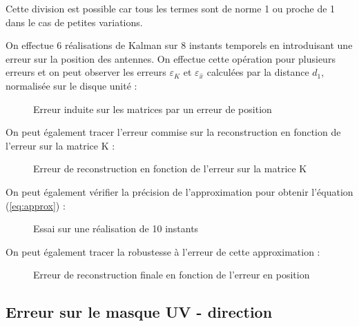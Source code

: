 \documentclass[titlepage]{article}
\begin{document}
	Cette division est possible car tous les termes sont de norme 1 ou proche de 1 dans le cas de petites variations.
	
	On effectue 6 réalisations de Kalman sur 8 instants temporels en introduisant une erreur sur la position des antennes. On effectue cette opération pour plusieurs erreurs et on peut observer les erreurs $\varepsilon_K$ et $\varepsilon_{\widehat{x}}$ calculées par la distance $d_1$, normalisée sur le disque unité :
	
	\begin{figure}[H]
		\centering
		\begin{subfigure}{.5\textwidth}
			\centering
			
		\end{subfigure}%
		\begin{subfigure}{.5\textwidth}
			\centering
			
		\end{subfigure}
		\caption{Erreur induite sur les matrices par un erreur de position}
	\end{figure}

	On peut également tracer l'erreur commise sur la reconstruction en fonction de l'erreur sur la matrice K :
	
	\begin{figure}[H]
		\centering
		
		\caption{Erreur de reconstruction en fonction de l'erreur sur la matrice K}
	\end{figure}
	
	On peut également vérifier la précision de l'approximation pour obtenir l'équation (\ref{eq:approx}) : 
	
	\begin{figure}[H]
		\centering
		
		\caption{Essai sur une réalisation de 10 instants}
	\end{figure}

	On peut également tracer la robustesse à l'erreur de cette approximation :
	
	\begin{figure}[H]
		\centering
		
		\caption{Erreur de reconstruction finale en fonction de l'erreur en position}
	\end{figure}

	\subsection{Erreur sur le masque UV - direction}
	
\end{document}

